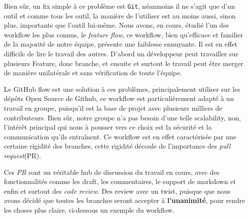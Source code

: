 \documentclass[a4paper,french,final]{memoir}
\begin{document}
Bien sûr, un fix simple à ce problème est \texttt{Git}, néanmoins il ne s'agit que d'un outil et comme tous les outil, la manière
de l'utiliser est au moins aussi, sinon plus, importante que l'outil lui-même.
Nous avons, en cours, étudié l'un des workflow les plus connus, le \emph{feature flow}, ce workflow, bien qu'efficace et familier de 
la majorité de notre équipe, présente une faiblesse ennuyante. Il est en effet difficile de lire le travail des autres.
D'abord un développeur peut travailler sur plusieurs Feature, donc branche, et ensuite et surtout le travail peut être
merger de manière unilatérale et sans vérification de toute l'équipe.

Le GitHub flow est une solution à ces problèmes, principalement utiliser sur les dépôts Open Source de Github, ce workflow est particulièrement adapté à un travail en groupe, puisqu'il est la base de projet avec plusieurs milliers de contributeurs.
Bien sûr, notre groupe n'a pas besoin d'une telle scalability, non, l'intérêt principal qui nous à pousser vers ce choix est la 
sécurité et la communication qu'ils entraînent. Ce workflow est en effet caractérisée par une certaine rigidité des branches, cette
rigidité découle de l'importance des \emph{pull request}(PR).


Ces \emph{PR} sont un véritable hub de discussion du 
travail en cours, avec des fonctionnalités comme les draft, les commentaires, le support de markdown et enfin et surtout des \emph{code review}. Des review avec un twist, puisque que nous avons décidé que toutes les branches seront accepter à \textbf{l'unanimité},
pour rendre les choses plus claire, ci-dessous un exemple du workflow.
\end{document}

